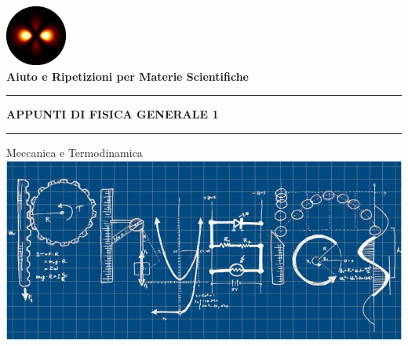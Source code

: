 \begin{titlepage}
\begin{center}

\href{\Grouplink}{\includegraphics[width=0.15\textwidth]{../logo.png}}\\
\huge{\textbf{Aiuto e Ripetizioni per Materie Scientifiche}}\\
\vspace{25mm}

\hrule
\vspace{2.5mm}
\Huge{\textbf{APPUNTI DI FISICA GENERALE 1}}
\vspace{2.5mm}
\hrule
\vspace{2.5mm}
\huge{Meccanica e Termodinamica}\\[20mm]

\href{https://elearning.uniroma1.it/pluginfile.php/996072/course/summary/physics.jpg}{\includegraphics[width=1\textwidth]{images/copertina.jpg}}
\end{center}
\end{titlepage}
